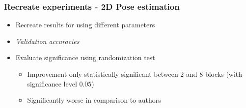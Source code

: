 \documentclass[9pt]{beamer}
\newenvironment{myframe}[1][]{%
\begin{frame}%
\frametitle{#1}
\setcounter{footnote}{0}


}{%
\end{frame}%
}
\begin{document}
\begin{myframe}[Recreate experiments - 2D Pose estimation]
    \begin{itemize}
        \item Recreate results for using different parameters
        \item \textit{Validation accuracies}
        \item Evaluate significance using randomization test
        \begin{itemize}
            \item Improvement only statistically significant between $2$ and $8$ blocks (with significance level $0.05$)
            \item Significantly worse in comparison to authors
        \end{itemize}
    \end{itemize}
    \begin{figure}
        \begin{table}[]
            \small
            \centering
\end{table}
\end{figure}
\end{myframe}
\end{document}
